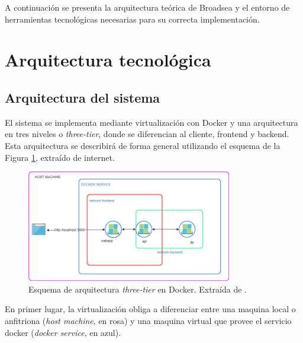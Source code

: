 A continuación se presenta la arquitectura teórica de Broadsea y el entorno de herramientas tecnológicas necesarias para su correcta implementación.

\section{Arquitectura tecnológica}

\subsection{Arquitectura del sistema}

El sistema se implementa mediante virtualización con Docker y una arquitectura en tres niveles o \textit{three-tier}, donde se diferencian al cliente, frontend y backend. Esta arquitectura se describirá de forma general utilizando el esquema de la Figura \ref{fig:threetierDocker}, extraído de internet.

\begin{figure}[H]
    \centering
    \includegraphics[width=0.80\textwidth]{figures/threetierDocker.png}
    \caption{Esquema de arquitectura \textit{three-tier} en Docker. Extraída de \cite{threetierDocker}.}
    \label{fig:threetierDocker}
\end{figure}

En primer lugar, la virtualización obliga a diferenciar entre una maquina local o anfitriona (\textit{host machine}, en rosa) y una maquina virtual que provee el servicio docker (\textit{docker service}, en azul). 

